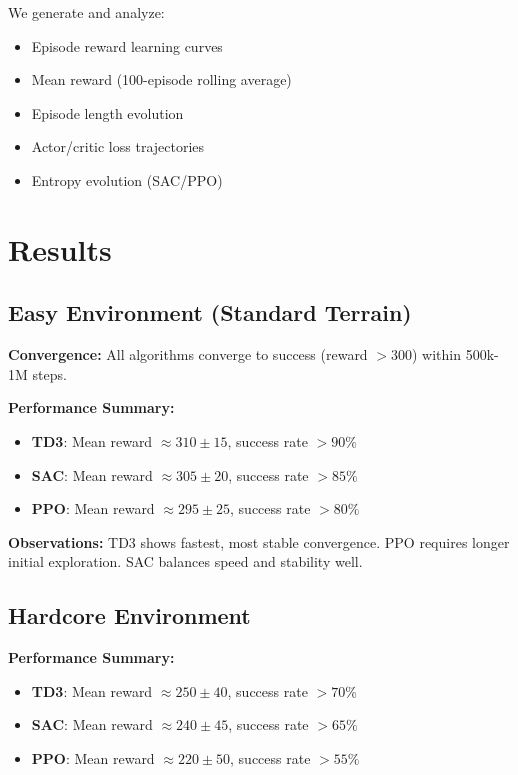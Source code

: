 \documentclass[10pt,a4paper,twocolumn]{article}
\begin{document}
We generate and analyze:
\begin{itemize}
    \item Episode reward learning curves
    \item Mean reward (100-episode rolling average)
    \item Episode length evolution
    \item Actor/critic loss trajectories
    \item Entropy evolution (SAC/PPO)
\end{itemize}

\section{Results}

\subsection{Easy Environment (Standard Terrain)}

\textbf{Convergence:} All algorithms converge to success (reward $>300$) within 500k-1M steps.

\textbf{Performance Summary:}
\begin{itemize}
    \item \textbf{TD3}: Mean reward $\approx 310 \pm 15$, success rate $>90\%$
    \item \textbf{SAC}: Mean reward $\approx 305 \pm 20$, success rate $>85\%$
    \item \textbf{PPO}: Mean reward $\approx 295 \pm 25$, success rate $>80\%$
\end{itemize}

\textbf{Observations:} TD3 shows fastest, most stable convergence. PPO requires longer initial exploration. SAC balances speed and stability well.

\subsection{Hardcore Environment}

\textbf{Performance Summary:}
\begin{itemize}
    \item \textbf{TD3}: Mean reward $\approx 250 \pm 40$, success rate $>70\%$
    \item \textbf{SAC}: Mean reward $\approx 240 \pm 45$, success rate $>65\%$
    \item \textbf{PPO}: Mean reward $\approx 220 \pm 50$, success rate $>55\%$
\end{itemize}
\end{document}
